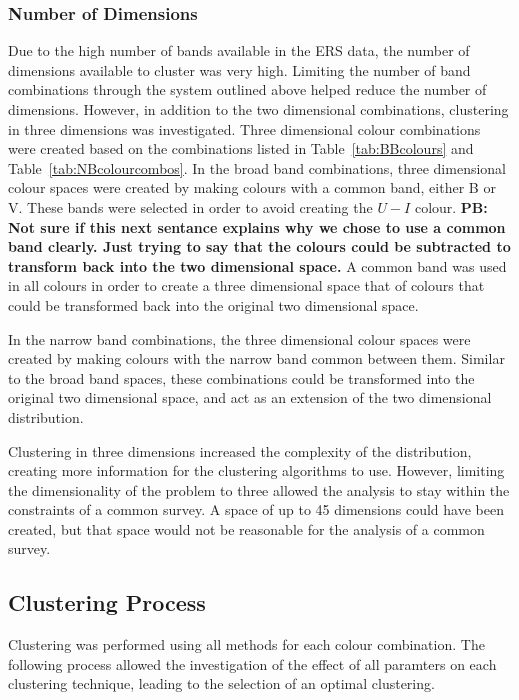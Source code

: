 \subsubsection{Number of Dimensions}
Due to the high number of bands available in the ERS data, the number of dimensions available to cluster was very high.
Limiting the number of band combinations through the system outlined above helped reduce the number of dimensions.
However, in addition to the two dimensional combinations, clustering in three dimensions was investigated.
Three dimensional colour combinations were created based on the combinations listed in Table~\ref{tab:BBcolours} and Table~\ref{tab:NBcolourcombos}.
In the broad band combinations, three dimensional colour spaces were created by making colours with a common band, either B or V.
These bands were selected in order to avoid creating the $U - I$ colour.
\textbf{PB: Not sure if this next sentance explains why we chose to use a common band clearly. Just trying to say that the colours could be subtracted to transform back into the two dimensional space.}
A common band was used in all colours in order to create a three dimensional space that of colours that could be transformed back into the original two dimensional space. 

In the narrow band combinations, the three dimensional colour spaces were created by making colours with the narrow band common between them.
Similar to the broad band spaces, these combinations could be transformed into the original two dimensional space, and act as an extension of the two dimensional distribution.

Clustering in three dimensions increased the complexity of the distribution, creating more information for the clustering algorithms to use.
However, limiting the dimensionality of the problem to three allowed the analysis to stay within the constraints of a common survey.
A space of up to 45 dimensions could have been created, but that space would not be reasonable for the analysis of a common survey.

\subsection{Clustering Process}
Clustering was performed using all methods for each colour combination. 
The following process allowed the investigation of the effect of all paramters on each clustering technique, leading to the selection of an optimal clustering.

